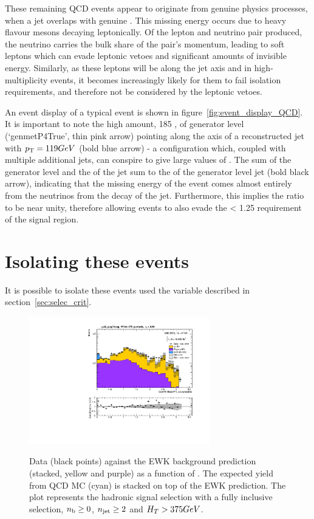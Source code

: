 These remaining QCD events appear to originate from genuine physics processes,
when a jet overlaps with genuine \met. This missing energy occurs due to heavy
flavour mesons decaying leptonically. Of the lepton and neutrino pair produced,
the neutrino
carries the bulk share of the pair's momentum, leading to soft leptons which
can evade leptonic vetoes and significant amounts of invisible energy. Similarly,
as these leptons will be along the jet axis and in high-multiplicity events,
it becomes increasingly likely for them to fail isolation requirements, and
therefore not be considered by the leptonic vetoes.

An event display of a typical event is shown in figure~\ref{fig:event_display_QCD}.
It is important to note the high amount, 185 \gev, of generator level
\met (`genmetP4True', thin pink arrow) pointing along the axis of a reconstructed
jet with ${p_{\text T}} = 119 GeV$ (bold blue arrow) - a configuration which,
coupled with multiple additional jets, can conspire to give
large values of \alphat. The sum of the generator level \met and
the \Pt of the jet sum to the \Pt of the generator level jet (bold black arrow),
indicating that the missing energy of the event comes almost entirely from the
neutrinos from the decay of the jet. Furthermore, this implies the ratio
\mhtmet to be near unity, therefore allowing events to also evade the \mhtmet <
1.25 requirement of the signal region.

\section{Isolating these events}

It is possible to isolate these events used the \mindphistar variable described
in section~\ref{sec:selec_crit}.

\begin{figure}[h!]
\centering
\includegraphics[width=0.7\textwidth]
{Figs/datapred/Prediction_ComMinBiasDPhi_acceptedJets_all_375_upwards_QCD.pdf}
\label{fig:data_pred_dphistar_qcd}
\caption{Data (black points) against the EWK background prediction 
(stacked, yellow and purple) as a function of \mindphistar. The expected yield
from QCD MC (cyan) is stacked on top of the EWK prediction. The plot represents
the hadronic signal selection with a fully inclusive selection, $n_{\text{b}} \geq 0$,
$n_{\text{jet}} \geq 2$ and $H_T > 375 GeV$.}
\end{figure}


